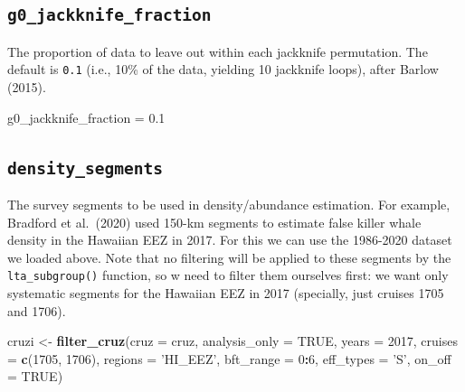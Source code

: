 \documentclass[
]{book}
\newenvironment{Shaded}{\begin{snugshade}}{\end{snugshade}}
\newcommand{\DataTypeTok}[1]{\textcolor[rgb]{0.13,0.29,0.53}{#1}}
\newcommand{\DecValTok}[1]{\textcolor[rgb]{0.00,0.00,0.81}{#1}}
\newcommand{\FloatTok}[1]{\textcolor[rgb]{0.00,0.00,0.81}{#1}}
\newcommand{\KeywordTok}[1]{\textcolor[rgb]{0.13,0.29,0.53}{\textbf{#1}}}
\newcommand{\NormalTok}[1]{#1}
\newcommand{\OperatorTok}[1]{\textcolor[rgb]{0.81,0.36,0.00}{\textbf{#1}}}
\newcommand{\OtherTok}[1]{\textcolor[rgb]{0.56,0.35,0.01}{#1}}
\newcommand{\StringTok}[1]{\textcolor[rgb]{0.31,0.60,0.02}{#1}}
\begin{document}
\hypertarget{g0_jackknife_fraction}{%
\subsection*{\texorpdfstring{\texttt{g0\_jackknife\_fraction}}{g0\_jackknife\_fraction}}\label{g0_jackknife_fraction}}

The proportion of data to leave out within each jackknife permutation. The default is \texttt{0.1} (i.e., 10\% of the data, yielding 10 jackknife loops), after Barlow (2015).

\begin{Shaded}
\begin{Highlighting}[]
\NormalTok{g0_jackknife_fraction =}\StringTok{ }\FloatTok{0.1}
\end{Highlighting}
\end{Shaded}

\hypertarget{density_segments}{%
\subsection*{\texorpdfstring{\texttt{density\_segments}}{density\_segments}}\label{density_segments}}

The survey segments to be used in density/abundance estimation. For example, Bradford et al.~(2020) used 150-km segments to estimate false killer whale density in the Hawaiian EEZ in 2017. For this we can use the 1986-2020 dataset we loaded above. Note that no filtering will be applied to these segments by the \texttt{lta\_subgroup()} function, so w need to filter them ourselves first: we want only systematic segments for the Hawaiian EEZ in 2017 (specially, just cruises 1705 and 1706).

\begin{Shaded}
\begin{Highlighting}[]
\NormalTok{cruzi <-}\StringTok{ }\KeywordTok{filter_cruz}\NormalTok{(}\DataTypeTok{cruz =}\NormalTok{ cruz,}
                      \DataTypeTok{analysis_only =} \OtherTok{TRUE}\NormalTok{,}
                      \DataTypeTok{years =} \DecValTok{2017}\NormalTok{,}
                      \DataTypeTok{cruises =} \KeywordTok{c}\NormalTok{(}\DecValTok{1705}\NormalTok{, }\DecValTok{1706}\NormalTok{),}
                      \DataTypeTok{regions =} \StringTok{'HI_EEZ'}\NormalTok{,}
                      \DataTypeTok{bft_range =} \DecValTok{0}\OperatorTok{:}\DecValTok{6}\NormalTok{,}
                      \DataTypeTok{eff_types =} \StringTok{'S'}\NormalTok{,}
                      \DataTypeTok{on_off =} \OtherTok{TRUE}\NormalTok{)}
\end{Highlighting}
\end{Shaded}
\end{document}

